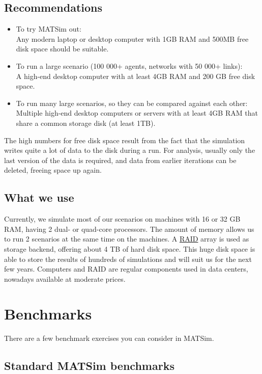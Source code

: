 \subsection{Recommendations}
\begin{itemize}
	\item To try MATSim out:
\\Any modern laptop or desktop computer with 1GB RAM and 500MB free disk space should be suitable.
	\item To run a large scenario (100 000+ agents, networks with 50 000+ links): 
\\A high-end desktop computer with at least 4GB RAM and 200 GB free disk space.
	\item To run many large scenarios, so they can be compared against each other: 
\\Multiple high-end desktop computers or servers with at least 4GB RAM that share a common storage disk (at least 1TB).
\end{itemize}

The  high numbers for free disk space result from the fact that the  simulation writes quite a lot of data to the disk during a run. For  analysis, usually only the last version of the data is required, and  data from earlier iterations can be deleted, freeing space up again.

\subsection{What we use}

Currently,  we simulate most of our scenarios on machines with 16 or 32 GB RAM,  having 2 dual- or quad-core processors. The amount of memory allows us to run 2  scenarios at the same time on the machines. A \href{http://en.wikipedia.org/wiki/RAID}{RAID}  array is used as storage backend, offering about 4 TB of hard disk  space. This huge disk space is able to store the results of hundreds of  simulations and will suit us for the next few years. Computers and RAID  are regular components used in data centers, nowadays available at moderate prices.

\section{Benchmarks}

There are a few benchmark exercises you can consider in MATSim.

\subsection{Standard MATSim benchmarks}

